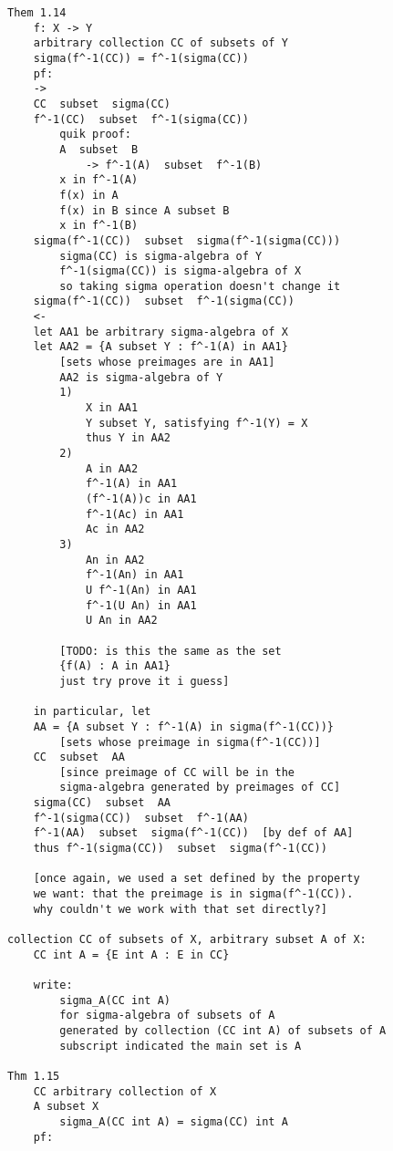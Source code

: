 \documentclass{article}
\begin{document}
\begin{flushleft}
\begin{verbatim}
Them 1.14
    f: X -> Y
    arbitrary collection CC of subsets of Y 
    sigma(f^-1(CC)) = f^-1(sigma(CC))
    pf:
    ->
    CC  subset  sigma(CC)
    f^-1(CC)  subset  f^-1(sigma(CC))
        quik proof:
        A  subset  B
            -> f^-1(A)  subset  f^-1(B)
        x in f^-1(A)
        f(x) in A
        f(x) in B since A subset B
        x in f^-1(B)
    sigma(f^-1(CC))  subset  sigma(f^-1(sigma(CC)))
        sigma(CC) is sigma-algebra of Y 
        f^-1(sigma(CC)) is sigma-algebra of X 
        so taking sigma operation doesn't change it 
    sigma(f^-1(CC))  subset  f^-1(sigma(CC))
    <-
    let AA1 be arbitrary sigma-algebra of X 
    let AA2 = {A subset Y : f^-1(A) in AA1}
        [sets whose preimages are in AA1]
        AA2 is sigma-algebra of Y 
        1) 
            X in AA1 
            Y subset Y, satisfying f^-1(Y) = X
            thus Y in AA2
        2) 
            A in AA2 
            f^-1(A) in AA1 
            (f^-1(A))c in AA1 
            f^-1(Ac) in AA1 
            Ac in AA2 
        3)
            An in AA2
            f^-1(An) in AA1 
            U f^-1(An) in AA1 
            f^-1(U An) in AA1 
            U An in AA2 

        [TODO: is this the same as the set 
        {f(A) : A in AA1}
        just try prove it i guess]

    in particular, let 
    AA = {A subset Y : f^-1(A) in sigma(f^-1(CC))}
        [sets whose preimage in sigma(f^-1(CC))]
    CC  subset  AA 
        [since preimage of CC will be in the 
        sigma-algebra generated by preimages of CC]
    sigma(CC)  subset  AA 
    f^-1(sigma(CC))  subset  f^-1(AA) 
    f^-1(AA)  subset  sigma(f^-1(CC))  [by def of AA] 
    thus f^-1(sigma(CC))  subset  sigma(f^-1(CC))

    [once again, we used a set defined by the property
    we want: that the preimage is in sigma(f^-1(CC)).
    why couldn't we work with that set directly?]

collection CC of subsets of X, arbitrary subset A of X:
    CC int A = {E int A : E in CC}

    write:
        sigma_A(CC int A)
        for sigma-algebra of subsets of A 
        generated by collection (CC int A) of subsets of A
        subscript indicated the main set is A

Thm 1.15
    CC arbitrary collection of X 
    A subset X
        sigma_A(CC int A) = sigma(CC) int A 
    pf:


\end{verbatim}
\end{flushleft}
\end{document}
